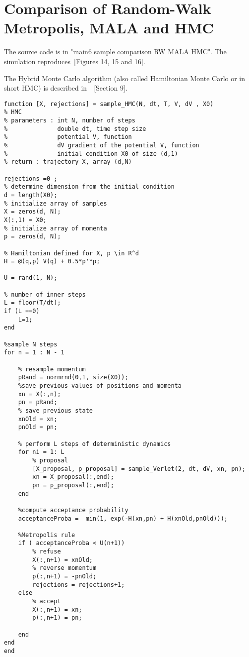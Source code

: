 \documentclass{scrartcl}
\begin{document}
\section{Comparison of Random-Walk Metropolis, MALA and HMC}

The source code is in "main6$\_$sample$\_$comparison$\_$RW$\_$MALA$\_$HMC". The simulation reproduces~\cite{sanz2014markov}[Figures 14, 15 and 16]. 

The Hybrid Monte Carlo algorithm (also called Hamiltonian Monte Carlo or in short HMC) is described in~~\cite{sanz2014markov}[Section 9]. 
\begin{verbatim}
function [X, rejections] = sample_HMC(N, dt, T, V, dV , X0)
% HMC
% parameters : int N, number of steps
%              double dt, time step size
%              potential V, function
%              dV gradient of the potential V, function
%              initial condition X0 of size (d,1)
% return : trajectory X, array (d,N)

rejections =0 ;
% determine dimension from the initial condition
d = length(X0);
% initialize array of samples
X = zeros(d, N);
X(:,1) = X0;
% initialize array of momenta
p = zeros(d, N);

% Hamiltonian defined for X, p \in R^d
H = @(q,p) V(q) + 0.5*p'*p;

U = rand(1, N);

% number of inner steps
L = floor(T/dt);
if (L ==0)
    L=1;
end

%sample N steps
for n = 1 : N - 1
    
    % resample momentum
    pRand = normrnd(0,1, size(X0));
    %save previous values of positions and momenta    
    xn = X(:,n);
    pn = pRand;
    % save previous state
    xnOld = xn;
    pnOld = pn;
    
    % perform L steps of deterministic dynamics
    for ni = 1: L
        % proposal
        [X_proposal, p_proposal] = sample_Verlet(2, dt, dV, xn, pn);
        xn = X_proposal(:,end);
        pn = p_proposal(:,end);
    end
    
    %compute acceptance probability
    acceptanceProba =  min(1, exp(-H(xn,pn) + H(xnOld,pnOld)));
    
    %Metropolis rule
    if ( acceptanceProba < U(n+1))
        % refuse
        X(:,n+1) = xnOld;
        % reverse momentum
        p(:,n+1) = -pnOld;
        rejections = rejections+1;
    else
        % accept
        X(:,n+1) = xn;
        p(:,n+1) = pn;
        
    end
end
end
\end{verbatim}
\end{document}
